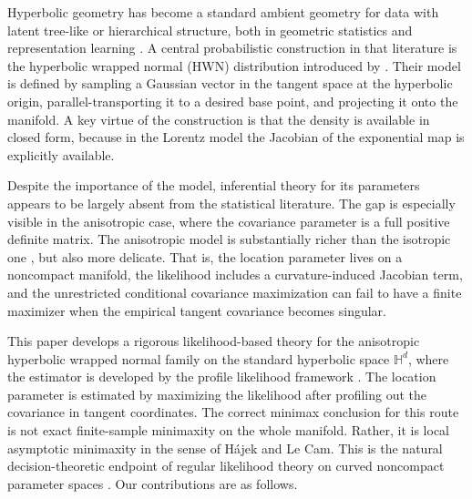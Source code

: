 \documentclass[11pt]{article}
\newcommand{\bbH}{\mathbb{H}}
\begin{document}
Hyperbolic geometry has become a standard ambient geometry for data with latent tree-like or hierarchical structure, both in geometric statistics and representation learning \citep{nickel_2017_PoincareEmbeddingsLearning, nickel_2018_LearningContinuousHierarchies}. A central probabilistic construction in that literature is the hyperbolic wrapped normal (HWN) distribution introduced by \citet{nagano_2019_WrappedNormalDistribution}. Their model is defined by sampling a Gaussian vector in the tangent space at the hyperbolic origin, parallel-transporting it to a desired base point, and projecting it onto the manifold. A key virtue of the construction is that the density is available in closed form, because in the Lorentz model the Jacobian of the exponential map is explicitly available.


Despite the importance of the model, inferential theory for its parameters appears to be largely absent from the statistical literature. The gap is especially visible in the anisotropic case, where the covariance parameter is a full positive definite matrix. The anisotropic model is substantially richer than the isotropic one \citep{said_2018_GaussianDistributionsRiemannian, you_2026_FiniteMixtureModeling}, but also more delicate. That is, the location parameter lives on a noncompact manifold, the likelihood includes a curvature-induced Jacobian term, and the unrestricted conditional covariance maximization can fail to have a finite maximizer when the empirical tangent covariance becomes singular.


This paper develops a rigorous likelihood-based theory for the anisotropic hyperbolic wrapped normal family on the standard hyperbolic space $\bbH^d$, where the estimator is developed by the profile likelihood framework \citep{box_1964_AnalysisTransformations, cox_1970_AnalysisBinaryData}. The location parameter is estimated by maximizing the likelihood after profiling out the covariance in tangent coordinates. The correct minimax conclusion for this route is not exact finite-sample minimaxity on the whole manifold. Rather, it is local asymptotic minimaxity in the sense of H\'ajek and Le Cam. This is the natural decision-theoretic endpoint of regular likelihood theory on curved noncompact parameter spaces \citep{hajek_1972_LocalAsymptoticMinimax, vandervaart_1998_AsymptoticStatistics}. Our contributions are as follows.
\end{document}

